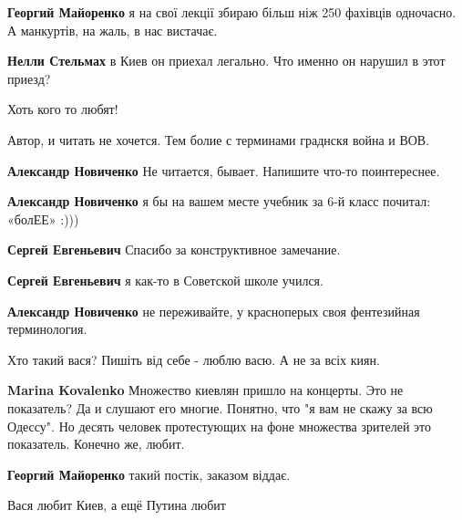 \begin{itemize}
\begin{itemize}
\begin{itemize} %
\textbf{Георгий Майоренко} я на свої лекції збираю більш ніж 250 фахівців одночасно.
А манкуртів, на жаль, в нас вистачає.

\textbf{Нелли Стельмах} в Киев он приехал легально. Что именно он нарушил в этот приезд?
\end{itemize} %

\end{itemize} %

Хоть кого то любят!

Автор, и читать не хочется.
Тем болие с терминами граднскя война и ВОВ.

\begin{itemize} %
\textbf{Александр Новиченко} Не читается, бывает. Напишите что-то поинтереснее.

\textbf{Александр Новиченко} я бы на вашем месте учебник за 6-й класс почитал: «болЕЕ» :)))

\begin{itemize} %
\textbf{Сергей Евгеньевич} Спасибо за конструктивное замечание.

\textbf{Сергей Евгеньевич} я как-то в Советской школе учился.
\end{itemize} %

\textbf{Александр Новиченко} не переживайте, у красноперых своя фентезийная терминология.
\end{itemize} %

Хто такий вася? Пишіть від себе - люблю васю. А не за всіх киян.

\begin{itemize} %
\textbf{Marina Kovalenko} Множество киевлян пришло на концерты. Это не показатель? Да и слушают его многие. Понятно, что "я вам не скажу за всю Одессу". Но десять человек протестующих на фоне множества зрителей это показатель. Конечно же, любит.

\textbf{Георгий Майоренко} такий постік, заказом віддає.
\end{itemize} %

Вася любит Киев, а ещё Путина любит


\end{itemize} %

